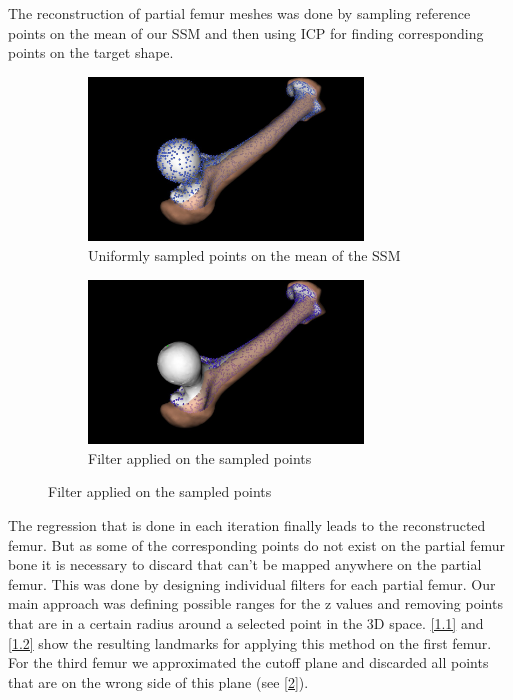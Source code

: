 \documentclass{article}
\begin{document}
	The reconstruction of partial femur meshes was done by sampling reference points on the mean of our SSM and then using ICP for finding corresponding points on the target shape. \\
	\begin{figure}
		\begin{subfigure}{.5\textwidth}
		\centering
		\includegraphics[width=7.3cm]{1.jpg}
		\caption{Uniformly sampled points on the mean of the SSM}
		
		\label{1.1}
	\end{subfigure}	
	\begin{subfigure}{.5\textwidth}
		\centering
		 \includegraphics[width=7.3cm]{2.jpg}
		\caption{Filter applied on the sampled points}
		\label{1.2}
	\end{subfigure}	
	\end{figure}

	
	
	The regression that is done in each iteration finally leads to the reconstructed femur. But as some of the corresponding points do not exist on the partial femur bone it is necessary to discard that can’t be mapped anywhere on the partial femur. This was done by designing individual filters for each partial femur. 
	Our main approach was defining possible ranges for the z values and removing points that are in a certain radius around a selected point in the 3D space. \autoref{1.1} and \autoref{1.2} show the resulting landmarks for applying this method on the first femur. For the third femur we approximated the cutoff plane and discarded all points that are on the wrong side of this plane (see \autoref{2}).\\
	
\end{document}
